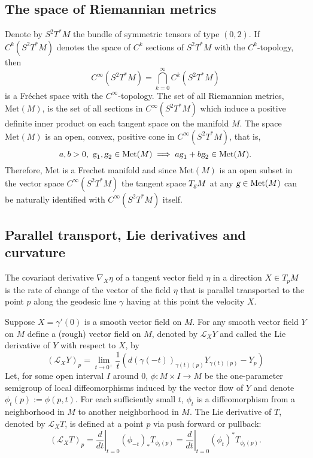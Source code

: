 \documentclass{article}
\theoremstyle{plain}
\theoremstyle{definition}
\numberwithin{equation}{section}
\newcommand{\g}{\ensuremath{\textsl{g}}}
\newcommand{\Met}{\ensuremath{\mathrm{Met}}}
\newcommand{\lie}{\ensuremath{\mathcal{L}}}
\begin{document}
\subsection{The space of Riemannian metrics}
Denote by $S^2T^*M$ the bundle of  symmetric tensors of type $(0,2)$. If $C^k(S^2T^*M)$ denotes the space of $C^k$ sections of  $S^2T^*M$ with the $C^k$-topology, then
\[
C^\infty (S^2T^*M) = \bigcap_{k=0}^\infty C^k(S^2T^*M)
\]
is a Fréchet space with the $C^\infty$-topology. The set of all Riemannian metrics, $\Met(M)$, is the set of all sections in $C^\infty (S^2T^*M)$ which induce a positive definite inner product on each tangent space on the manifold $M$.
The space $\Met(M)$ is an open, convex, positive cone in $C^\infty(S^2T^*M)$, that is,
\[
a,b>0,\ \g_1,\g_2\in \Met(M) \implies a\g_1+b\g_2\in\Met(M).
\]
Therefore, $\Met$ is a Frechet manifold and since $\Met(M)$ is an open subset in the vector space $C^\infty (S^2T^*M)$  the tangent space $T_\g M$ at any $\g\in \Met(M)$ can be naturally identified with $C^\infty (S^2T^*M)$ itself.

\subsection{Parallel transport, Lie derivatives and curvature}

The covariant derivative $\nabla_X\eta$ of a tangent vector field $\eta$ in a
direction $X\in T_pM$ is the rate of change of the vector of the field $\eta$ that is parallel transported to the point $p$ along the geodesic line $\gamma$ having at this point the velocity $X$.

Suppose $X=\gamma'(0)$ is a smooth vector field on $M$. %
For any smooth vector field $Y$ on $M$ define a (rough) vector field on $M$, denoted by $\lie_XY$ and called the Lie derivative of $Y$ with respect to $X$, by
\[
(\lie_XY)_p = \lim_{t\to 0^+}\frac{1}{t}\left(d(\gamma(-t))_{\gamma(t)(p)}Y_{\gamma(t)(p)}-Y_p\right)
\]
Let, for some open interval $I$ around $0$, $\phi : M \times I \to M$ be the one-parameter semigroup of local diffeomorphisms induced by the vector flow of $Y$ and denote $\phi_t(p) := \phi(p, t)$. For each sufficiently small $t$, $\phi_t$ is a diffeomorphism from a neighborhood in $M$ to another neighborhood in $M$. The Lie derivative of $T$, denoted by $\lie_XT$, is defined at a point $p$ via push forward or pullback: 
\[
(\lie_XT)_p = \left.\frac{d}{dt}\right|_{t=0} (\phi_{-t})_*T_{\phi_t(p)}=\left.\frac{d}{dt}\right|_{t=0} (\phi_{t})^*T_{\phi_t(p)}.
\]
\end{document}
